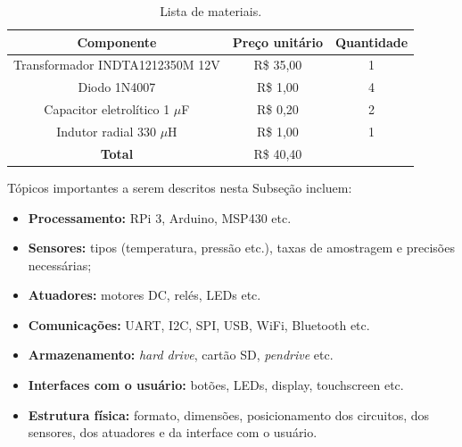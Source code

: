 \begin{table}[!htpb]
\caption{Lista de materiais.}
\label{tab:BOM}
\centering
\begin{tabular}{ccc}
\hline
\textbf{Componente} & \textbf{Preço unitário} & \textbf{Quantidade}\\
\hline 
Transformador INDTA1212350M 12V & R\$ 35,00 & 1 \\
Diodo 1N4007 & R\$ 1,00 & 4 \\
Capacitor eletrolítico 1 $\mu$F & R\$ 0,20 & 2\\
Indutor radial 330 $\mu$H & R\$ 1,00 & 1 \\
\hline
\textbf{Total} & R\$ 40,40 & \\
\hline
\end{tabular}
\end{table}

Tópicos importantes a serem descritos nesta Subseção incluem:

\begin{itemize}
    \item \textbf{Processamento:} RPi 3, Arduino, MSP430 etc.
    \item \textbf{Sensores:} tipos (temperatura, pressão etc.), taxas de amostragem e precisões necessárias;
    \item \textbf{Atuadores:} motores DC, relés, LEDs etc.
    \item \textbf{Comunicações:} UART, I2C, SPI, USB, WiFi, Bluetooth etc.
    \item \textbf{Armazenamento:} \textit{hard drive}, cartão SD, \textit{pendrive} etc.
    \item \textbf{Interfaces com o usuário:} botões, LEDs, display, touchscreen etc.	
    \item \textbf{Estrutura física:} formato, dimensões, posicionamento dos circuitos, dos sensores, dos atuadores e da interface com o usuário.
\end{itemize}
